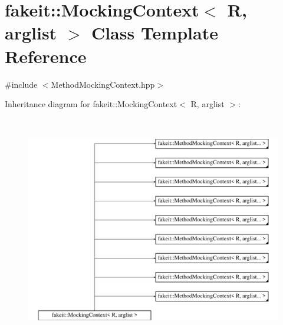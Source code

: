 \hypertarget{classfakeit_1_1MockingContext}{}\section{fakeit\+::Mocking\+Context$<$ R, arglist $>$ Class Template Reference}
\label{classfakeit_1_1MockingContext}


{\ttfamily \#include $<$Method\+Mocking\+Context.\+hpp$>$}

Inheritance diagram for fakeit\+::Mocking\+Context$<$ R, arglist $>$\+:\begin{figure}[H]
\begin{center}
\leavevmode
\includegraphics[height=10.000000cm]{classfakeit_1_1MockingContext}
\end{center}
\end{figure}
